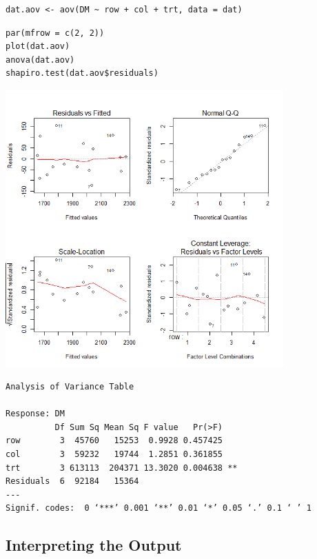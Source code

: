 \documentclass[a4paper, 10pt, fleqn, twosided]{memoir}
\begin{document}
\begin{tcolorbox}[title = Fitting the linear model for a LS]
\begin{verbatim}
dat.aov <- aov(DM ~ row + col + trt, data = dat)
\end{verbatim}

\tcblower
\begin{verbatim}
par(mfrow = c(2, 2))
plot(dat.aov)
anova(dat.aov)
shapiro.test(dat.aov$residuals)
\end{verbatim}
\end{tcolorbox}

\begin{tcolorbox}[title = Example 4 Output]
\includegraphics[width=0.8\textwidth, frame]{Example4Resplot.png}
\begin{verbatim}
Analysis of Variance Table

Response: DM
          Df Sum Sq Mean Sq F value   Pr(>F)
row        3  45760   15253  0.9928 0.457425
col        3  59232   19744  1.2851 0.361855
trt        3 613113  204371 13.3020 0.004638 **
Residuals  6  92184   15364
---
Signif. codes:  0 ‘***’ 0.001 ‘**’ 0.01 ‘*’ 0.05 ‘.’ 0.1 ‘ ’ 1
\end{verbatim}
\end{tcolorbox}


\subsection{Interpreting the Output}
\end{document}
